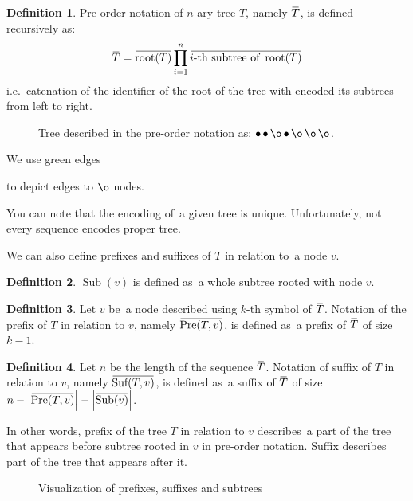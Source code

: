 \documentclass[final]{article}
\theoremstyle{definition}
\newtheorem{definition}{Definition}[subsection]
\theoremstyle{definition}
\theoremstyle{remark}
\newcommand{\ols}[1]{\mskip.5\thinmuskip\overline{\mskip-.5\thinmuskip {#1} \mskip-.5\thinmuskip}\mskip.5\thinmuskip} %
\newcommand{\enc}[1]{\ensuremath{\ols{#1}}}
\newcommand{\size}[1]{\ensuremath{\left|#1\right|}}
\DeclareMathOperator{\troot}{\text{root}}
\DeclareMathOperator{\tSub}{\text{Sub}}
\DeclareMathOperator{\tPre}{\text{Pre}}
\DeclareMathOperator{\tSuf}{\text{Suf}}
\DeclareMathOperator{\n}{\bullet}
\DeclareMathOperator{\no}{\o}
\begin{document}
\begin{definition}
    Pre-order notation of \(n\)-ary tree \(T\), namely \(\enc{T}\), is defined recursively as:
    \[\enc{T} = \enc{\troot(T)} \prod_{i=1}^{n} \enc{i\text{-th subtree of } \troot(T)}\]
    i.e.~catenation of the identifier of the root of the tree with encoded its subtrees from left to right.
\end{definition}

\begin{figure}[H]
    \centering
    
    \caption{Tree described in the pre-order notation as: \(\n \n \no \n \no \no \no\).}
    \label{fig:oononnn}
\end{figure}

We use green edges 
\begin{minipage}{1.5em}

\end{minipage}
to depict edges to \(\no\) nodes.

You can note that the encoding of~a given tree is unique. Unfortunately, not every sequence encodes proper tree.

We can also define prefixes and suffixes of \(T\) in relation to~a node \(v\).

\begin{definition}
    \(\tSub(v)\) is defined as~a whole subtree rooted with node \(v\).
\end{definition}

\begin{definition}
    Let \(v\) be~a node described using \(k\)-th symbol of \(\enc{T}\). Notation of the prefix of \(T\) in relation to \(v\), namely \(\enc{\tPre(T, v)}\), is defined as~a prefix of \enc{T} of size \(k - 1\).
\end{definition}

\begin{definition}
    Let \(n\) be the length of the sequence \(\enc{T}\). Notation of suffix of \(T\) in relation to \(v\), namely \(\enc{\tSuf(T, v)}\), is defined as~a suffix of \enc{T} of size \(n - \size{\enc{\tPre(T, v)}} - \size{\enc{\tSub(v)}}\).
\end{definition}

In other words, prefix of the tree \(T\) in relation to \(v\) describes~a part of the tree that appears before subtree rooted in \(v\) in pre-order notation. Suffix describes part of the tree that appears after it.

\begin{figure}[H]
    \centering
    
    \caption{Visualization of prefixes, suffixes and subtrees}
    \label{fig:presuf}
\end{figure}
\end{document}
